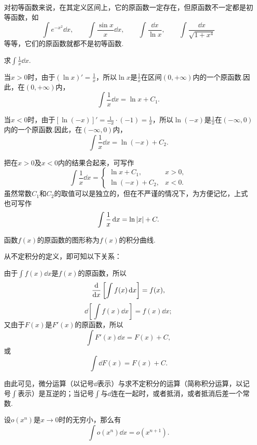 对初等函数来说，在其定义区间上，它的原函数一定存在，但原函数不一定都是初等函数，如\[
\int e^{-x^2} \dd{x}, \qquad
\int \frac{\sin x}{x} \dd{x}, \qquad
\int \frac{\dd{x}}{\ln{x}}, \qquad
\int \frac{\dd{x}}{\sqrt{1+x^4}}
\]
等等，它们的原函数就都不是初等函数.

\begin{example}
求\(\int \frac{1}{x} \dd{x}\).
\begin{solution}
当\(x > 0\)时，由于\((\ln x)' = \frac{1}{x}\)，所以\(\ln x\)是\(\frac{1}{x}\)在区间\((0,+\infty)\)内的一个原函数.因此，在\((0,+\infty)\)内，\[
\int \frac{1}{x} \dd{x} = \ln x + C_1.
\]

当\(x < 0\)时，由于\([\ln(-x)]' = \frac{1}{-x} \cdot (-1) = \frac{1}{x}\)，所以\(\ln(-x)\)是\(\frac{1}{x}\)在\((-\infty,0)\)内的一个原函数.因此，在\((-\infty,0)\)内，\[
\int \frac{1}{x} \dd{x} = \ln(-x) + C_2.
\]

把在\(x > 0\)及\(x < 0\)内的结果合起来，可写作\begin{equation}
\int \frac{1}{x} \dd{x} = \left\{ \begin{array}{lc}
\ln x + C_1, & x>0, \\
\ln(-x) + C_2, & x<0.
\end{array} \right.
\end{equation}
虽然常数\(C_1\)和\(C_2\)的取值可以是独立的，但在不严谨的情况下，为方便记忆，上式也可写作\begin{equation}
\int \frac{1}{x} \dd{x} = \ln\abs{x} + C.
\end{equation}
\end{solution}
\end{example}

\begin{definition}
函数\(f(x)\)的原函数的图形称为\(f(x)\)的积分曲线.
\end{definition}

从不定积分的定义，即可知以下关系：

由于\(\int f(x) \dd{x}\)是\(f(x)\)的原函数，所以\[
\dv{x} \left[ \int f(x) \dd{x} \right] = f(x),
\]\[
\dd\left[\int f(x) \dd{x}\right] = f(x) \dd{x};
\]又由于\(F(x)\)是\(F'(x)\)的原函数，所以\[
\int F'(x) \dd{x} = F(x) + C,
\]或\[
\int \dd{F(x)} = F(x) + C.
\]

由此可见，微分运算（以记号\(\dd\)表示）与求不定积分的运算（简称积分运算，以记号\(\int\)表示）是互逆的；当记号\(\int\)与\(\dd\)连在一起时，或者抵消，或者抵消后差一个常数.

\begin{example}
设\(o(x^n)\)是\(x\to0\)时的无穷小，那么有\[
\int o(x^n) \dd{x} = o(x^{n+1}).
\]
\end{example}

